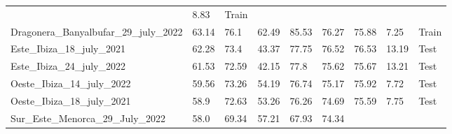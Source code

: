\begin{table}[H]
{\begin{tabular}{lllllllll}
                                                   & 8.83                &
            {\color[HTML]{66c2a5} Train}
            \\
            Dragonera\_Banyalbufar\_29\_july\_2022 & 63.14               & 76.1
                                                   & 62.49               &
            85.53
                                                   & 76.27               &
            75.88
                                                   & 7.25                &
            {\color[HTML]{66c2a5} Train}
            \\
            Este\_Ibiza\_18\_july\_2021            & 62.28               & 73.4
                                                   & 43.37               &
            77.75
                                                   & 76.52               &
            76.53
                                                   & 13.19               &
            {\color[HTML]{fc8d62} Test}
            \\
            Este\_Ibiza\_24\_july\_2022            & 61.53               &
            72.59
                                                   & 42.15               & 77.8
                                                   & 75.62               &
            75.67
                                                   & 13.21               &
            {\color[HTML]{fc8d62} Test}
            \\
            Oeste\_Ibiza\_14\_july\_2022           & 59.56               &
            73.26
                                                   & 54.19               &
            76.74
                                                   & 75.17               &
            75.92
                                                   & 7.72                &
            {\color[HTML]{fc8d62} Test}
            \\
            Oeste\_Ibiza\_18\_july\_2021           & 58.9                &
            72.63
                                                   & 53.26               &
            76.26
                                                   & 74.69               &
            75.59
                                                   & 7.75                &
            {\color[HTML]{fc8d62} Test}
            \\
            Sur\_Este\_Menorca\_29\_July\_2022     & 58.0                &
            69.34
                                                   & 57.21               &
            67.93
                                                   & 74.34               &

\end{tabular}}
\end{table}
